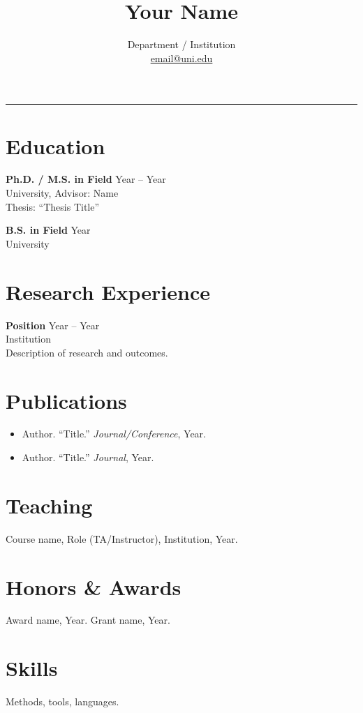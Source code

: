 \documentclass[11pt,a4paper]{article}
\title{\vspace{-1cm}\textbf{Your Name}}
\author{Department / Institution \\ \href{mailto:email@uni.edu}{email@uni.edu}}
\date{}
\begin{document}
\maketitle
\vspace{-0.6cm}
\begin{flushright}\rule{2cm}{2.5cm}\end{flushright}
\section*{Education}
\textbf{Ph.D. / M.S. in Field} \hfill Year -- Year \\
University, Advisor: Name \\
Thesis: ``Thesis Title''

\textbf{B.S. in Field} \hfill Year \\
University

\section*{Research Experience}
\textbf{Position} \hfill Year -- Year \\
Institution \\
Description of research and outcomes.

\section*{Publications}
\begin{itemize}
  \item Author. ``Title.'' \textit{Journal/Conference}, Year.
  \item Author. ``Title.'' \textit{Journal}, Year.
\end{itemize}

\section*{Teaching}
Course name, Role (TA/Instructor), Institution, Year.

\section*{Honors \& Awards}
Award name, Year. \quad Grant name, Year.

\section*{Skills}
Methods, tools, languages.
\end{document}
